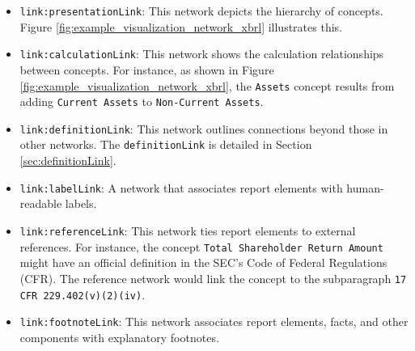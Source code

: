 \begin{itemize}
    \item \texttt{link:presentationLink}: This network depicts the hierarchy of concepts.
    Figure \ref{fig:example_visualization_network_xbrl} illustrates this.
    \item \texttt{link:calculationLink}: This network shows the calculation relationships between concepts.
    For instance, as shown in Figure \ref{fig:example_visualization_network_xbrl}, 
    the \texttt{Assets} concept results from adding \texttt{Current Assets} to \texttt{Non-Current Assets}.
    \item \texttt{link:definitionLink}: This network outlines connections beyond those in other networks.
    The \texttt{definitionLink} is detailed in Section \ref{sec:definitionLink}.
    \item \texttt{link:labelLink}: A network that associates report elements with human-readable labels.
    \item \texttt{link:referenceLink}: This network ties report elements to external references.
    For instance, the concept \texttt{Total Shareholder Return Amount} might have an official definition in the SEC's Code of Federal Regulations (CFR).
    The reference network would link the concept to the subparagraph \texttt{17 CFR 229.402(v)(2)(iv)}\cite{cfr_total_shareholder_return_amount}.
    \item \texttt{link:footnoteLink}: This network associates report elements, facts, and other components with explanatory footnotes.
\end{itemize}




